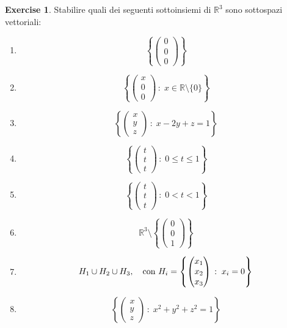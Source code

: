 \documentclass{article}
\theoremstyle{plain}
\theoremstyle{definition}
\newtheorem{xca}[exmp]{Exercise}
\theoremstyle{remark}
\begin{document}
\begin{bxthm}
\begin{xca}
    Stabilire quali dei seguenti sottoinsiemi di $\mathbb{R}^3$ sono sottospazi vettoriali:
    \begin{multicols}{2}
        \begin{enumerate}
            \item \[\left\{\begin{pmatrix}0\\0\\0\end{pmatrix}\right\}\]
            \item \[\left\{\begin{pmatrix}x\\0 \\0 \end{pmatrix}\,:\;x\in\mathbb{R}\setminus\{0\}\right\}\]
            \item \[\left\{\begin{pmatrix}x\\y \\z \end{pmatrix}\,:\;x-2y+z=1\right\}\]
            \item \[\left\{\begin{pmatrix}t\\t \\t \end{pmatrix}\,:\;0\leq t\leq 1\right\}\]
            \item \[\left\{\begin{pmatrix}t\\t \\t \end{pmatrix}\,:\;0< t< 1\right\}\]
            \item \[\mathbb{R}^3\setminus\left\{\begin{pmatrix}0\\ 0\\ 1\end{pmatrix}\right\}\]
            \item \[H_1\cup H_2\cup H_3,\quad \textup{con }H_i=\left\{\begin{pmatrix}x_1\\x_2 \\x_3 \end{pmatrix}\,:\;x_i=0\right\}\]
            \item \[\left\{\begin{pmatrix}x\\y \\z \end{pmatrix}\,:\;x^2+y^2+z^2=1\right\}\]

\end{enumerate}
\end{multicols}
\end{xca}
\end{bxthm}
\end{document}
